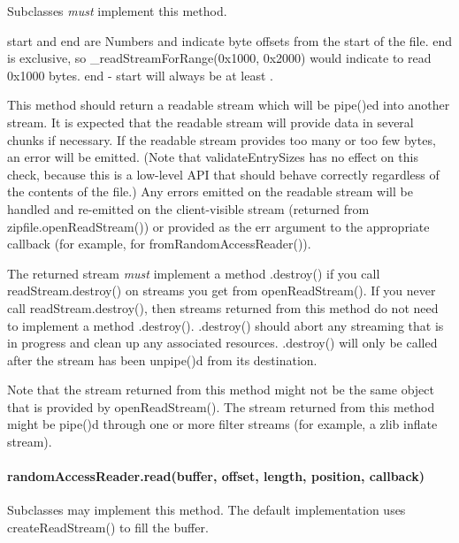 Subclasses {\itshape must} implement this method.

{\ttfamily start} and {\ttfamily end} are Numbers and indicate byte offsets from the start of the file. {\ttfamily end} is exclusive, so {\ttfamily \+\_\+read\+Stream\+For\+Range(0x1000, 0x2000)} would indicate to read {\ttfamily 0x1000} bytes. {\ttfamily end -\/ start} will always be at least {}.

This method should return a readable stream which will be {\ttfamily pipe()}ed into another stream. It is expected that the readable stream will provide data in several chunks if necessary. If the readable stream provides too many or too few bytes, an error will be emitted. (Note that {\ttfamily validate\+Entry\+Sizes} has no effect on this check, because this is a low-\/level A\+PI that should behave correctly regardless of the contents of the file.) Any errors emitted on the readable stream will be handled and re-\/emitted on the client-\/visible stream (returned from {\ttfamily zipfile.\+open\+Read\+Stream()}) or provided as the {\ttfamily err} argument to the appropriate callback (for example, for {\ttfamily from\+Random\+Access\+Reader()}).

The returned stream {\itshape must} implement a method {\ttfamily .destroy()} if you call {\ttfamily read\+Stream.\+destroy()} on streams you get from {\ttfamily open\+Read\+Stream()}. If you never call {\ttfamily read\+Stream.\+destroy()}, then streams returned from this method do not need to implement a method {\ttfamily .destroy()}. {\ttfamily .destroy()} should abort any streaming that is in progress and clean up any associated resources. {\ttfamily .destroy()} will only be called after the stream has been {\ttfamily unpipe()}d from its destination.

Note that the stream returned from this method might not be the same object that is provided by {\ttfamily open\+Read\+Stream()}. The stream returned from this method might be {\ttfamily pipe()}d through one or more filter streams (for example, a zlib inflate stream).

\paragraph*{random\+Access\+Reader.\+read(buffer, offset, length, position, callback)}

Subclasses may implement this method. The default implementation uses {\ttfamily create\+Read\+Stream()} to fill the {\ttfamily buffer}.

